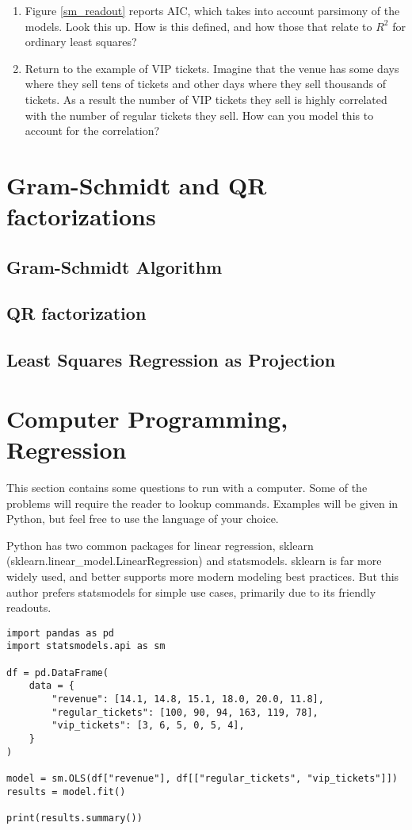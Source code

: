\documentclass{amsbook}
\begin{document}
\begin{enumerate}
\item Figure \ref{sm_readout} reports AIC, which takes into account parsimony of the models.  Look this up.  How is this defined, and how those that relate to $R^2$ for ordinary least squares?
\item Return to the example of VIP tickets.  Imagine that the venue has some days where they sell tens of tickets and other days where they sell thousands of tickets.  As a result the number of VIP tickets they sell is highly correlated with the number of regular tickets they sell.  How can you model this to account for the correlation?
\end{enumerate}

\section{Gram-Schmidt and QR factorizations}
\subsection{Gram-Schmidt Algorithm}
\subsection{QR factorization}
\subsection{Least Squares Regression as Projection}

\section{Computer Programming, Regression}

This section contains some questions to run with a computer.  Some of the problems will require the reader to lookup commands.  Examples will be given in Python, but feel free to use the language of your choice.

Python has two common packages for linear regression, sklearn (sklearn.linear\_model.LinearRegression) and statsmodels.  sklearn is far more widely used, and better supports more modern modeling best practices.  But this author prefers statsmodels for simple use cases, primarily due to its friendly readouts.

\begin{lstlisting}
import pandas as pd
import statsmodels.api as sm

df = pd.DataFrame(
    data = {
        "revenue": [14.1, 14.8, 15.1, 18.0, 20.0, 11.8],
        "regular_tickets": [100, 90, 94, 163, 119, 78],
        "vip_tickets": [3, 6, 5, 0, 5, 4],
    }
)

model = sm.OLS(df["revenue"], df[["regular_tickets", "vip_tickets"]])
results = model.fit()

print(results.summary())
\end{lstlisting}
\end{document}
